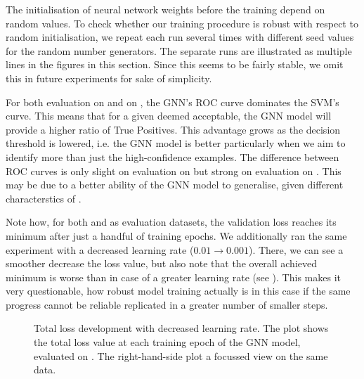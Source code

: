 \documentclass[
	fontsize=10pt, %
	twoside=false, %
	secnumdepth=1, %
  toc=indentunnumbered %
]{kaobook}
\begin{document}
The initialisation of neural network weights before the training depend on
random values. To check whether our training procedure is robust with respect to random
initialisation, we repeat each run several times with different seed values for
the random number generators. The separate runs are illustrated as multiple
lines in the figures in this section. Since this seems to be fairly stable, we omit this
in future experiments for sake of simplicity.

For both evaluation on \PDMap and on \ReconMap, the GNN's ROC curve dominates
the SVM's curve. This means that for a given \FPR deemed acceptable, the GNN
model will provide a higher ratio of True Positives. This advantage grows as the
decision threshold is lowered, i.e. the GNN model is better particularly when we
aim to identify more than just the high-confidence examples. The difference
between ROC curves is only slight on evaluation on \PDMap but strong on
evaluation on \ReconMap. This may be due to a better ability of the GNN model to
generalise, given different characterstics of \ReconMap.

Note how, for both \PDMap and \ReconMap as evaluation datasets, the validation
loss reaches its minimum after just a handful of training epochs. We
additionally ran the same experiment with a decreased learning rate ($0.01
\rightarrow 0.001$). There, we can see a smoother decrease the loss value, but
also note that the overall achieved minimum is worse than in case of a greater
learning rate (see ). This makes it
very questionable, how robust model training actually is in this case if the
same progress cannot be reliable replicated in a greater number of smaller steps.
\begin{figure}[h]
  \centering
  \begin{subfigure}[h]{0.49\linewidth}
  \end{subfigure}
  \begin{subfigure}[h]{0.49\linewidth}
  \end{subfigure}
  \caption{Total loss development with decreased learning rate. The plot shows
    the total loss value at each training epoch of the GNN model, evaluated on
    \ReconMap. The right-hand-side plot a focussed view on the same data.}
  \label{fig:svm-repro-lowlr-reconmapolder-loss}
\end{figure}
\end{document}
